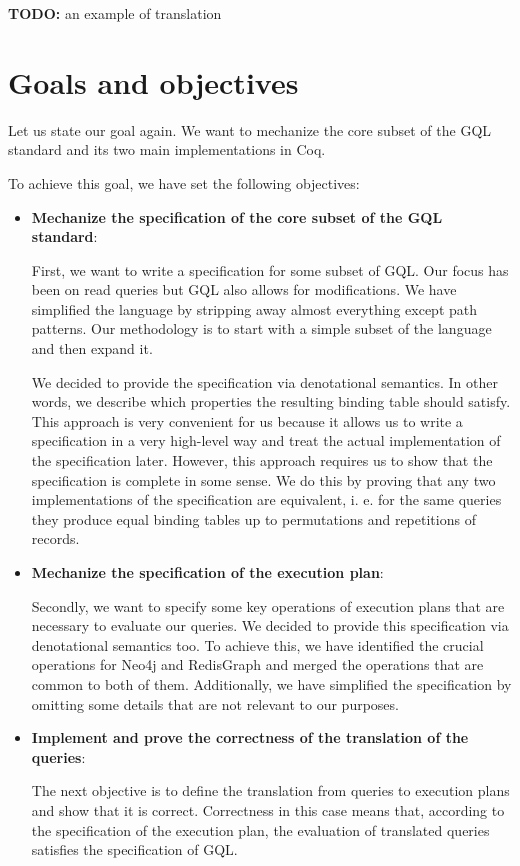 \documentclass[14pt]{constructor-thesis}
\theoremstyle{definition}
\newcommand{\todo}[1]{
  \begin{tcolorbox}[colframe=red!75!black,colback=red!5!white,arc=0pt,fonttitle=\bfseries]
  \textbf{TODO:} #1
  \end{tcolorbox}
}
\begin{document}
\todo{an example of translation}

\section{Goals and objectives}

Let us state our goal again. We want to mechanize the core subset of the GQL standard and its two main implementations in Coq.

To achieve this goal, we have set the following objectives:
\begin{itemize}
  \item \textbf{Mechanize the specification of the core subset of the GQL standard}:
  
  First, we want to write a specification for some subset of GQL. Our focus has been on read queries but GQL also allows for modifications. We have simplified the language by stripping away almost everything except path patterns. Our methodology is to start with a simple subset of the language and then expand it.

  We decided to provide the specification via denotational semantics. In other words, we describe which properties the resulting binding table should satisfy. This approach is very convenient for us because it allows us to write a specification in a very high-level way and treat the actual implementation of the specification later. However, this approach requires us to show that the specification is complete in some sense. We do this by proving that any two implementations of the specification are equivalent, i. e. for the same queries they produce equal binding tables up to permutations and repetitions of records.

  \item \textbf{Mechanize the specification of the execution plan}:
  
  Secondly, we want to specify some key operations of execution plans that are necessary to evaluate our queries. We decided to provide this specification via denotational semantics too. To achieve this, we have identified the crucial operations for Neo4j and RedisGraph and merged the operations that are common to both of them. Additionally, we have simplified the specification by omitting some details that are not relevant to our purposes.

  \item \textbf{Implement and prove the correctness of the translation of the queries}:
  
  The next objective is to define the translation from queries to execution plans and show that it is correct. Correctness in this case means that, according to the specification of the execution plan, the evaluation of translated queries satisfies the specification of GQL.


\end{itemize}
\end{document}
